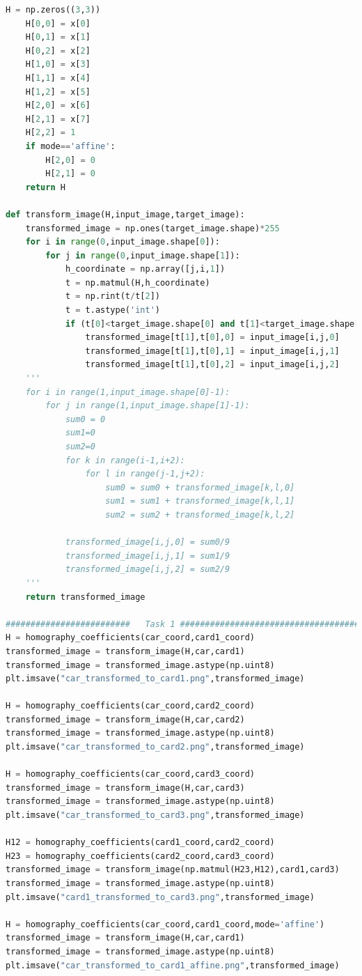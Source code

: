 \documentclass{article}
\begin{document}
\begin{lstlisting}[language=Python]
	H = np.zeros((3,3))
	H[0,0] = x[0]
	H[0,1] = x[1]
	H[0,2] = x[2]
	H[1,0] = x[3]
	H[1,1] = x[4]
	H[1,2] = x[5]
	H[2,0] = x[6]
	H[2,1] = x[7]
	H[2,2] = 1
	if mode=='affine':
		H[2,0] = 0
		H[2,1] = 0
	return H

def transform_image(H,input_image,target_image):
	transformed_image = np.ones(target_image.shape)*255
	for i in range(0,input_image.shape[0]):
		for j in range(0,input_image.shape[1]):
			h_coordinate = np.array([j,i,1])
			t = np.matmul(H,h_coordinate)
			t = np.rint(t/t[2])
			t = t.astype('int')
			if (t[0]<target_image.shape[0] and t[1]<target_image.shape[1]):
				transformed_image[t[1],t[0],0] = input_image[i,j,0]
				transformed_image[t[1],t[0],1] = input_image[i,j,1]
				transformed_image[t[1],t[0],2] = input_image[i,j,2]
	'''
	for i in range(1,input_image.shape[0]-1):
		for j in range(1,input_image.shape[1]-1):
			sum0 = 0
			sum1=0
			sum2=0
			for k in range(i-1,i+2):
				for l in range(j-1,j+2):
					sum0 = sum0 + transformed_image[k,l,0]
					sum1 = sum1 + transformed_image[k,l,1]
					sum2 = sum2 + transformed_image[k,l,2]

			transformed_image[i,j,0] = sum0/9
			transformed_image[i,j,1] = sum1/9
			transformed_image[i,j,2] = sum2/9
	'''
	return transformed_image

#########################   Task 1 #############################################
H = homography_coefficients(car_coord,card1_coord)
transformed_image = transform_image(H,car,card1)
transformed_image = transformed_image.astype(np.uint8)
plt.imsave("car_transformed_to_card1.png",transformed_image)

H = homography_coefficients(car_coord,card2_coord)
transformed_image = transform_image(H,car,card2)
transformed_image = transformed_image.astype(np.uint8)
plt.imsave("car_transformed_to_card2.png",transformed_image)

H = homography_coefficients(car_coord,card3_coord)
transformed_image = transform_image(H,car,card3)
transformed_image = transformed_image.astype(np.uint8)
plt.imsave("car_transformed_to_card3.png",transformed_image)

H12 = homography_coefficients(card1_coord,card2_coord)
H23 = homography_coefficients(card2_coord,card3_coord)
transformed_image = transform_image(np.matmul(H23,H12),card1,card3)
transformed_image = transformed_image.astype(np.uint8)
plt.imsave("card1_transformed_to_card3.png",transformed_image)

H = homography_coefficients(car_coord,card1_coord,mode='affine')
transformed_image = transform_image(H,car,card1)
transformed_image = transformed_image.astype(np.uint8)
plt.imsave("car_transformed_to_card1_affine.png",transformed_image)


\end{lstlisting}
\end{document}
